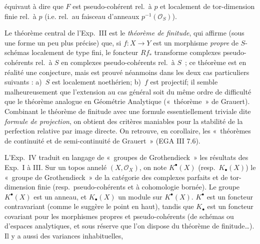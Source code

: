 équivaut à dire que \(F\) est pseudo-cohérent rel.\ à \(p\) et localement de tor-dimension finie rel.\ à \(p\) (i.e. rel.\ au faisceau d'anneaux \(p^{-1}(\mathcal O_S)\)).

Le théorème central de l'Exp.\ III est le \emph{théorème de finitude}, qui affirme (sous une forme un peu plus précise) que, si \(f:X\to Y\) est un morphisme \emph{propre} de \(S\)-schémas localement de type fini, le foncteur \(Rf_*\) transforme complexes pseudo-cohérents rel.\ à \(S\) en complexes pseudo-cohérents rel.\ à \(S\)~; ce théorème est en réalité une conjecture, mais est prouvé néanmoins dans les deux cas particuliers suivants : a)~\(S\) est localement noethérien; b)~\(f\) est projectif; il semble malheureusement que l'extension au cas général soit du même ordre de difficulté que le théorème analogue en Géométrie Analytique («~théorème~» de Grauert). Combinant le théorème de finitude avec une formule essentiellement triviale dite \emph{formule de projection}, on obtient des critères maniables pour la stabilité de la perfection relative par image directe. On retrouve, en corollaire, les «~théorèmes de continuité et de semi-continuité de Grauert~» (EGA III 7.6).

L'Exp.\ IV traduit en langage de «~groupes de Grothendieck~» les résultats des Exp.\ I à III. Sur un topos annelé \((X,\mathcal O_X)\), on note \(K^\bullet(X)\) (resp.\ \(K_\bullet(X)\)) le «~groupe de Grothendieck~» de la catégorie des complexes parfaits et de tor-dimension finie (resp.\ pseudo-cohérents et à cohomologie bornée). Le groupe \(K^\bullet(X)\) est un anneau, et \(K_\bullet(X)\) un module sur \(K^\bullet(X)\). \(K^\bullet\) est un foncteur contravariant (comme le suggère le point en haut), tandis que \(K_\bullet\) est un foncteur covariant pour les morphismes propres et pseudo-cohérents (de schémas ou d'espaces analytiques, et sous réserve que l'on dispose du théorème de finitude\dots). Il y a aussi des variances inhabituelles,
